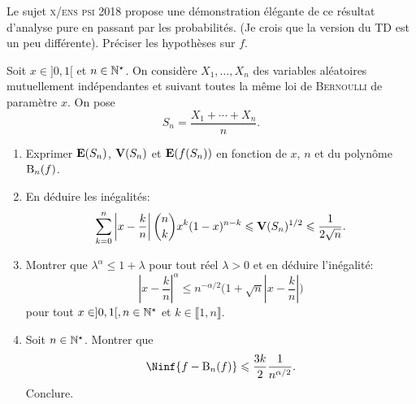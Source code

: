 Le sujet \textsc{x/ens psi 2018} propose une démonstration élégante de ce résultat d'analyse pure en passant par les probabilités. (Je crois que la version du TD est un peu différente).
Préciser les hypothèses sur $f$.
\begin{exercice}        
    Soit $x \in ]0, 1[$ et $n \in \mathbb{N}^\star$. On considère $X_1, \dots, X_n$ des variables aléatoires mutuellement indépendantes et suivant toutes la même loi de \textsc{Bernoulli} de paramètre $x$. On pose
    $$S_n = \frac{X_1 + \cdots + X_n}{n}.$$
    \begin{enumerate}
        \item Exprimer $\mathbf{E}(S_n)$, $\mathbf{V}(S_n)$ et $\mathbf{E}(f(S_n))$ en fonction de $x$, $n$ et du polynôme $\mathrm{B}_n(f)$.
        \item En déduire les inégalités:
        $$\sum_{k=0}^{n} \left| x- \frac{k}{n} \right| \binom{n}{k} x^k (1-x)^{n-k} \leqslant \mathbf{V}(S_n)^{1/2} \leqslant \frac{1}{2\sqrt{n}}.$$
        \item Montrer que $\lambda^\alpha \leqslant 1+\lambda$ pour tout réel $\lambda > 0$ et en déduire l'inégalité:
        $$\left|x-\frac{k}{n} \right|^\alpha \leqslant n^{-\alpha/2} \Bigg(1 + \sqrt{n} \left|x - \frac{k}{n} \right| \Bigg)$$
        pour tout $x \in ]0, 1[, n \in \mathbb{N}^\star$ et $k \in \llbracket 1, n \rrbracket$.
        \item Soit $n \in \mathbb{N}^\star$. Montrer que 
        $$\Ninf{f-\Bernstein_n(f)} \leqslant \frac{3k}{2} \frac{1}{n^{\alpha/2}}.$$
        Conclure.
    \end{enumerate}
\end{exercice}


